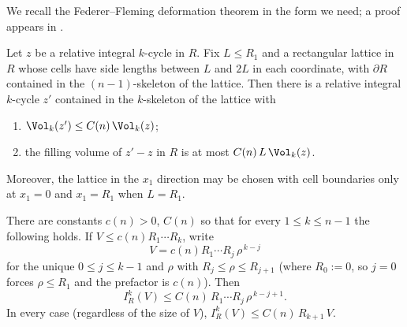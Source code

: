 We recall the Federer--Fleming deformation theorem in the form we need; a proof appears in \cite{G3}.

\begin{theorem}\label{FF}
Let $z$ be a relative integral $k$-cycle in $R$. Fix $L\le R_1$ and a rectangular lattice in $R$ whose cells have side lengths between $L$ and $2L$ in each coordinate, with $\partial R$ contained in the $(n-1)$-skeleton of the lattice. Then there is a relative integral $k$-cycle $z'$ contained in the $k$-skeleton of the lattice with
\begin{enumerate}
\item $\Vol_k(z')\le C(n)\,\Vol_k(z)$;
\item the filling volume of $z'-z$ in $R$ is at most $C(n)\,L\,\Vol_k(z)$.
\end{enumerate}
Moreover, the lattice in the $x_1$ direction may be chosen with cell boundaries only at $x_1=0$ and $x_1=R_1$ when $L=R_1$.
\end{theorem}

\begin{lemma}\label{iso}
There are constants $c(n)>0$, $C(n)$ so that for every $1\le k\le n-1$ the following holds. If $V\le c(n)R_1\cdots R_k$, write
\[
V=c(n)R_1\cdots R_j\,\rho^{\,k-j}
\]
for the unique $0\le j\le k-1$ and $\rho$ with $R_j\le\rho\le R_{j+1}$ (where $R_0:=0$, so $j=0$ forces $\rho\le R_1$ and the prefactor is $c(n)$). Then
\[
I_R^k(V)\le C(n)\,R_1\cdots R_j\,\rho^{\,k-j+1}.
\]
In every case (regardless of the size of $V$), $I_R^k(V)\le C(n)\,R_{k+1}\,V$.
\end{lemma}

